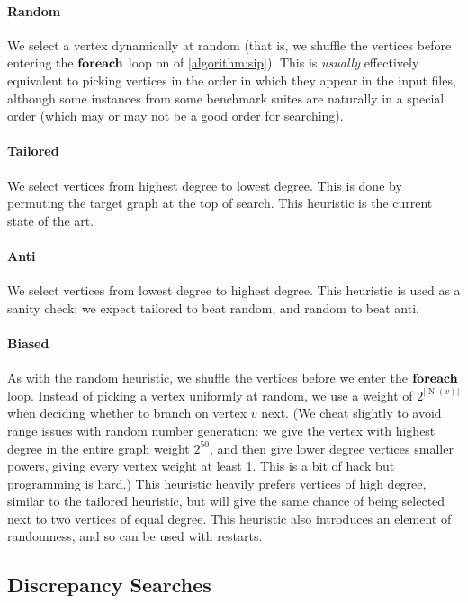 \documentclass{article}
\newcommand{\neighbourhood}{\operatorname{N}}
\begin{document}
\paragraph{Random} We select a vertex dynamically at random (that is, we shuffle the vertices before
entering the $\KwSty{foreach}$ loop on  of \cref{algorithm:sip}). This is
\emph{usually} effectively equivalent to picking vertices in the order in which they appear in the
input files, although some instances from some benchmark suites are naturally in a special order
(which may or may not be a good order for searching).

\paragraph{Tailored} We select vertices from highest degree to lowest degree. This is done by
permuting the target graph at the top of search. This heuristic is the current state of the art.

\paragraph{Anti} We select vertices from lowest degree to highest degree. This heuristic is used as
a sanity check: we expect tailored to beat random, and random to beat anti.

\paragraph{Biased} As with the random heuristic, we shuffle the vertices before we enter the
$\KwSty{foreach}$ loop. Instead of picking a vertex uniformly at random, we use a weight of
$2^{\left|\neighbourhood(v)\right|}$ when deciding whether to branch on vertex $v$ next. (We cheat
slightly to avoid range issues with random number generation: we give the vertex with highest degree
in the entire graph weight $2^{50}$, and then give lower degree vertices smaller powers, giving
every vertex weight at least 1.  This is a bit of hack but programming is hard.) This heuristic
heavily prefers vertices of high degree, similar to the tailored heuristic, but will give the same
chance of being selected next to two vertices of equal degree. This heuristic also introduces an
element of randomness, and so can be used with restarts.

\subsection{Discrepancy Searches}
\end{document}
